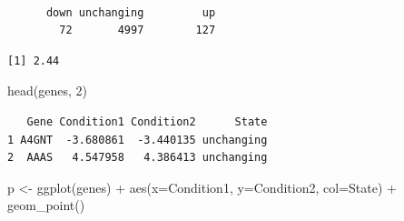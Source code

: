 \documentclass[
  letterpaper,
  DIV=11,
  numbers=noendperiod]{scrartcl}
\newenvironment{Shaded}{\begin{snugshade}}{\end{snugshade}}
\newcommand{\AttributeTok}[1]{\textcolor[rgb]{0.40,0.45,0.13}{#1}}
\newcommand{\DecValTok}[1]{\textcolor[rgb]{0.68,0.00,0.00}{#1}}
\newcommand{\FunctionTok}[1]{\textcolor[rgb]{0.28,0.35,0.67}{#1}}
\newcommand{\NormalTok}[1]{\textcolor[rgb]{0.00,0.23,0.31}{#1}}
\newcommand{\OtherTok}[1]{\textcolor[rgb]{0.00,0.23,0.31}{#1}}
\newcommand{\SpecialCharTok}[1]{\textcolor[rgb]{0.37,0.37,0.37}{#1}}
\newcommand{\StringTok}[1]{\textcolor[rgb]{0.13,0.47,0.30}{#1}}
\begin{document}
\begin{Shaded}
\end{Shaded}

\begin{verbatim}

      down unchanging         up 
        72       4997        127 
\end{verbatim}

\begin{Shaded}
\end{Shaded}

\begin{verbatim}
[1] 2.44
\end{verbatim}

\begin{Shaded}
\begin{Highlighting}[]
\FunctionTok{head}\NormalTok{(genes, }\DecValTok{2}\NormalTok{)}
\end{Highlighting}
\end{Shaded}

\begin{verbatim}
   Gene Condition1 Condition2      State
1 A4GNT  -3.680861  -3.440135 unchanging
2  AAAS   4.547958   4.386413 unchanging
\end{verbatim}

\begin{Shaded}
\begin{Highlighting}[]
\NormalTok{p }\OtherTok{\textless{}{-}} \FunctionTok{ggplot}\NormalTok{(genes) }\SpecialCharTok{+} \FunctionTok{aes}\NormalTok{(}\AttributeTok{x=}\NormalTok{Condition1, }\AttributeTok{y=}\NormalTok{Condition2, }\AttributeTok{col=}\NormalTok{State) }\SpecialCharTok{+} \FunctionTok{geom\_point}\NormalTok{()}
\end{Highlighting}
\end{Shaded}
\end{document}
